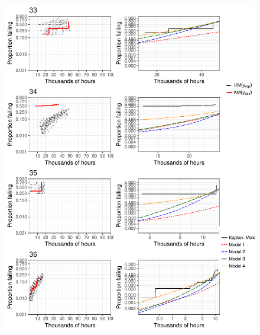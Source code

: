 \documentclass[12pt]{article}
\begin{document}
\begin{figure}[H]
\includegraphics[width=\textwidth]{ppcheck-v2-9.pdf}
\end{figure}
\end{document}
